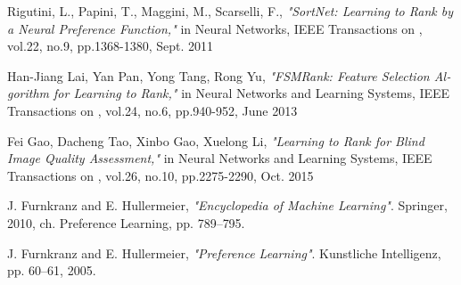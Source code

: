\documentclass{CSICC2016}
\renewcommand{\ }{\hspace{0em}}
\newcommand{\مق}{\lr}
\renewcommand{\یا}{یادگیری\ ارجحیت }
\newcommand{\یم}{یادگیری\ ماشین }
\renewcommand{\تر}{تابع رتبه\ بند }
\newcommand{\ار}{ارجحیت }
\renewcommand{\|}[1][.3em]{\hspace{#1}|\hspace{#1}}
\renewcommand{\,}[1][.3em]{,\hspace{#1}}
\begin{document}
\begin{thebibliography}{1}
\begin{latin}\scriptsize

Rigutini, L., Papini, T., Maggini, M., Scarselli, F., \emph{"SortNet: Learning to Rank by a Neural Preference Function,"} in Neural Networks, IEEE Transactions on , vol.22, no.9, pp.1368-1380, Sept. 2011

Han-Jiang Lai, Yan Pan, Yong Tang, Rong Yu, \emph{"FSMRank: Feature Selection Algorithm for Learning to Rank,"} in Neural Networks and Learning Systems, IEEE Transactions on , vol.24, no.6, pp.940-952, June 2013

Fei Gao, Dacheng Tao, Xinbo Gao, Xuelong Li, \emph{"Learning to Rank for Blind Image Quality Assessment,"} in Neural Networks and Learning Systems, IEEE Transactions on , vol.26, no.10, pp.2275-2290, Oct. 2015

J. Furnkranz and E. Hullermeier, \emph{"Encyclopedia of Machine Learning"}. Springer, 2010, ch. Preference Learning, pp. 789–795.

J. Furnkranz and E. Hullermeier, \emph{"Preference Learning"}. Kunstliche Intelligenz, pp. 60–61, 2005.

\end{latin}
\end{thebibliography}
\newpage
\begin{latin}
\theendnotes
\end{latin}
\end{document}
